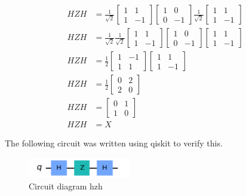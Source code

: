 \begin{equation*} 
\begin{split}
HZH & = \tfrac{1}{\sqrt{2}}\begin{bmatrix} 1 & 1 \\ 1 & -1 \end{bmatrix} \begin{bmatrix} 1 & 0 \\ 0 & -1 \end{bmatrix}\tfrac{1}{\sqrt{2}}\begin{bmatrix} 1 & 1 \\ 1 & -1 \end{bmatrix} \\
HZH & = \tfrac{1}{\sqrt{2}}\tfrac{1}{\sqrt{2}}\begin{bmatrix} 1 & 1 \\ 1 & -1 \end{bmatrix} \begin{bmatrix} 1 & 0 \\ 0 & -1 \end{bmatrix}\begin{bmatrix} 1 & 1 \\ 1 & -1 \end{bmatrix} \\
HZH & = \tfrac{1}{2}\begin{bmatrix} 1 & -1 \\ 1 & 1 \end{bmatrix}\begin{bmatrix} 1 & 1 \\ 1 & -1 \end{bmatrix}\\
HZH & = \tfrac{1}{2}\begin{bmatrix} 0 & 2 \\ 2 & 0 \end{bmatrix} \\
HZH & = \begin{bmatrix} 0 & 1 \\ 1 & 0 \end{bmatrix} \\
HZH & = X
\end{split}
\end{equation*}

The following circuit was written using qiskit to verify this.

\begin{figure}[h]
    \centering
    \includegraphics[width=0.4\textwidth]{lab2/images/hzhCircuit.png}
    \caption{Circuit diagram hzh} 
    \label{fig:hzhCircuit}
\end{figure}

